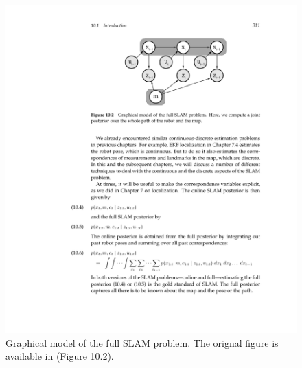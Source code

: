 \documentclass[10pt,journal,compsoc]{IEEEtran}
\begin{document}
\begin{figure}[thpb]
      \centering
      \includegraphics[width=\linewidth]{full_slam}
      \caption{Graphical model of the full SLAM problem. The orignal figure is available in\cite{Thrun:2005:PR:1121596} (Figure 10.2).}
      \label{fig:full_slam}
\end{figure}
\end{document}
